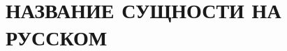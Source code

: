 
\section{{НАЗВАНИЕ СУЩНОСТИ НА РУССКОМ}}

\begin{{TYPE}}[{НАЗВАНИЕ СУЩНОСТИ НА РУССКОМ}]
\label{entity:{ID}}


\end{{TYPE}}
